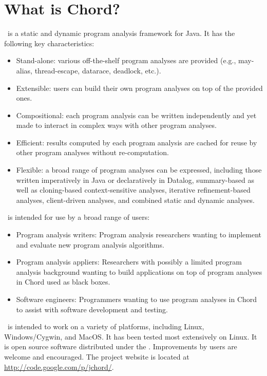 \section{What is Chord?}
\label{sec:whatis-chord}

\Chord\ is a static and dynamic program analysis framework for Java.
It has the following key characteristics:

\begin{itemize}
\item
Stand-alone: various off-the-shelf program analyses are provided (e.g., may-alias, thread-escape, datarace, deadlock, etc.).
\item
Extensible: users can build their own program analyses on top of the provided ones.
\item
Compositional: each program analysis can be written independently and yet made to interact in complex ways with other program analyses.
\item
Efficient: results computed by each program analysis are cached for reuse by other program analyses without re-computation.
\item
Flexible: a broad range of program analyses can be expressed, including those
written imperatively in Java or declaratively in Datalog, summary-based as well as cloning-based context-sensitive analyses,
iterative refinement-based analyses, client-driven analyses, and combined static and dynamic analyses.
\end{itemize}

\noindent \Chord\ is intended for use by a broad range of users:

\begin{itemize}
\item
Program analysis writers: Program analysis researchers wanting to implement and evaluate new program analysis algorithms.
\item
Program analysis appliers: Researchers with possibly a limited program analysis background wanting to build applications on
top of program analyses in Chord used as black boxes.
\item
Software engineers: Programmers wanting to use program analyses in Chord to assist with software development and testing.
\end{itemize}

\noindent \Chord\ is intended to work on a variety of platforms, including Linux, Windows/Cygwin, and MacOS.
It has been tested most extensively on Linux.
It is open source software distributed under the .
Improvements by users are welcome and encouraged.
The project website is located at \url{http://code.google.com/p/jchord/}.

